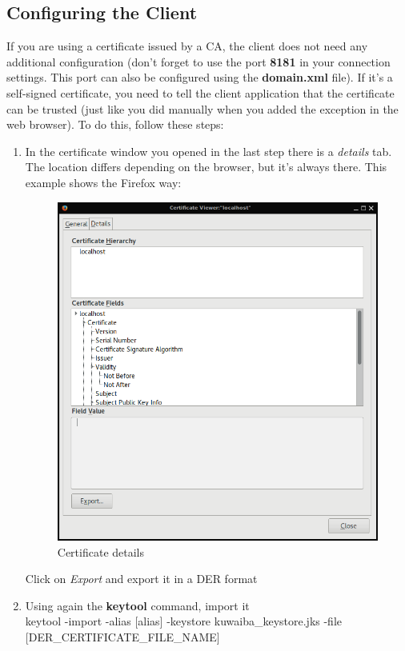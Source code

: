 \documentclass[a4paper]{article}
\begin{document}
\begin{appendices}
				\subsection{Configuring the Client}
				
				If you are using a certificate issued by a CA, the client does not need any additional configuration (don't forget to use the port \textbf{8181} in your connection settings. This port can also be configured using the \textbf{domain.xml} file). If it's a self-signed certificate, you need to tell the client application that the certificate can be trusted (just like you did manually when you added the exception in the web browser). To do this, follow these steps:
				\begin{enumerate}
					\item In the certificate window you opened in the last step there is a \textit{details} tab. The location differs depending on the browser, but it's always there. This example shows the Firefox way:
					
					\begin{figure}[h!]
						\centering
						\includegraphics[width=0.6\linewidth]{img/certificate_details.png} 	
						\caption{Certificate details}
						\label{fig:certificate-details}
					\end{figure}
					
					Click on \textit{Export} and export it in a DER format
					\item Using again the \textbf{keytool} command, import it\\
					
					keytool -import -alias [alias] -keystore kuwaiba\_keystore.jks -file [DER\_CERTIFICATE\_FILE\_NAME]\\
					

\end{enumerate}
\end{appendices}
\end{document}
